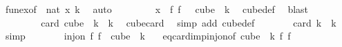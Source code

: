 \begin{isabellebody}
\ fun{\isacharunderscore}{\kern0pt}ex{\isacharbrackleft}{\kern0pt}of\ {\isachardoublequoteopen}{}{\isachardoublequoteclose}\ {\isachardoublequoteopen}{\isacharbraceleft}{\kern0pt}{\isachardot}{\kern0pt}{\isachardot}{\kern0pt}{\isacharless}{\kern0pt}{}{\isacharcolon}{\kern0pt}{\isacharcolon}{\kern0pt}nat{\isacharbraceright}{\kern0pt}{\isachardoublequoteclose}\ {\isachardoublequoteopen}x{\isachardoublequoteclose}\ {\isachardoublequoteopen}{\isacharbraceleft}{\kern0pt}{\isachardot}{\kern0pt}{\isachardot}{\kern0pt}{\isacharless}{\kern0pt}k{\isacharbraceright}{\kern0pt}{\isachardoublequoteclose}{\isacharbrackright}{\kern0pt}\ \isamarkupfalse%
\ auto\ \isanewline
\ \ \ \ \isamarkupfalse%
\ \isamarkupfalse%
\ {\isachardoublequoteopen}x\ {\isasymin}\ {\isacharparenleft}{\kern0pt}{\isasymlambda}f{\isachardot}{\kern0pt}\ f\ {}{\isacharparenright}{\kern0pt}\ {\isacharbackquote}{\kern0pt}\ cube\ {}\ k{\isachardoublequoteclose}\ \isamarkupfalse%
\ cube{\isacharunderscore}{\kern0pt}def\ \isamarkupfalse%
\ blast\isanewline
\ \ \isamarkupfalse%
\isanewline
\ \ \isamarkupfalse%
\ \isanewline
\ \ \isacommand{{\isacharbraceleft}{\kern0pt}}\isamarkupfalse%
\isanewline
\ \ \ \ \isamarkupfalse%
\ {\isachardoublequoteopen}card\ {\isacharparenleft}{\kern0pt}cube\ {}\ k{\isacharparenright}{\kern0pt}\ {\isacharequal}{\kern0pt}\ k{\isachardoublequoteclose}\ \isamarkupfalse%
\ cube{\isacharunderscore}{\kern0pt}card\ \isamarkupfalse%
\ {\isacharparenleft}{\kern0pt}simp\ add{\isacharcolon}{\kern0pt}\ cube{\isacharunderscore}{\kern0pt}def{\isacharparenright}{\kern0pt}\isanewline
\ \ \ \ \isamarkupfalse%
\ \isamarkupfalse%
\ {\isachardoublequoteopen}card\ {\isacharbraceleft}{\kern0pt}{\isachardot}{\kern0pt}{\isachardot}{\kern0pt}{\isacharless}{\kern0pt}k{\isacharbraceright}{\kern0pt}\ {\isacharequal}{\kern0pt}\ k{\isachardoublequoteclose}\ \isamarkupfalse%
\ simp\isanewline
\ \ \ \ \isamarkupfalse%
\ \isamarkupfalse%
\ {\isachardoublequoteopen}inj{\isacharunderscore}{\kern0pt}on\ {\isacharparenleft}{\kern0pt}{\isasymlambda}f{\isachardot}{\kern0pt}\ f\ {}{\isacharparenright}{\kern0pt}\ {\isacharparenleft}{\kern0pt}cube\ {}\ k{\isacharparenright}{\kern0pt}{\isachardoublequoteclose}\ \isamarkupfalse%
\ {\isacharasterisk}{\kern0pt}\ eq{\isacharunderscore}{\kern0pt}card{\isacharunderscore}{\kern0pt}imp{\isacharunderscore}{\kern0pt}inj{\isacharunderscore}{\kern0pt}on{\isacharbrackleft}{\kern0pt}of\ {\isachardoublequoteopen}cube\ {}\ k{\isachardoublequoteclose}\ {\isachardoublequoteopen}{\isasymlambda}f{\isachardot}{\kern0pt}\ f\ {}{\isachardoublequoteclose}{\isacharbrackright}{\kern0pt}\ \isamarkupfalse%

\end{isabellebody}
